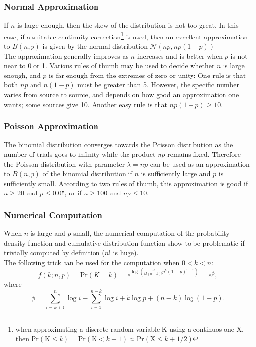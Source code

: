 \begin{appendices}
\subsubsection*{Normal Approximation}
If $n$ is large enough, then the skew of the distribution is not too great. In this case, if a suitable continuity correction\footnote{when approximating a discrete random variable $\textrm{K}$ using a continuos one $\textrm{X}$, then $\textrm{Pr}(\textrm{K}\leq k) = \textrm{Pr}(\textrm{K}< k+1) \approx \textrm{Pr}(\textrm{X}\leq k+1/2)$ } is used, then an excellent approximation to $B(n, p)$ is given by the normal distribution $\mathcal{N}(np,np(1-p))$\\
The approximation generally improves as $n$ increases and is better when $p$ is not near to 0 or 1. Various rules of thumb may be used to decide whether $n$ is large enough, and $p$ is far enough from the extremes of zero or unity:
One rule is that both $n p$ and $n(1-p)$ must be greater than 5. However, the specific number varies from source to source, and depends on how good an approximation one wants; some sources give 10. Another easy rule is that $np(1-p)\geq 10$.


\subsubsection*{Poisson Approximation}
The binomial distribution converges towards the Poisson distribution as the number of trials goes to infinity while the product $np$ remains fixed. Therefore the Poisson distribution with parameter $\lambda = np$ can be used as an approximation to $B(n, p)$ of the binomial distribution if $n$ is sufficiently large and $p$ is sufficiently small. According to two rules of thumb, this approximation is good if $n \geq 20$ and $p \leq 0.05$, or if $n \geq 100$ and $np \leq 10$.

\subsubsection*{Numerical Computation}
When $n$ is large and $p$ small, the numerical computation of the probability density function and cumulative distribution function show to be problematic if trivially computed by definition ($n!$ is huge).\\
The following trick can be used for the computation when $0<k<n$:
\begin{equation}
f(k;n,p)=\textrm{Pr}(K=k)= e^{\displaystyle \log(\frac{n!}{k!(n-k)!} p^{k} (1-p)^{n-k})}=e^{\phi},
\end{equation}
where
\begin{equation}
\phi=\sum_{i=k+1}^{n}\log i-\sum_{i=1}^{n-k}\log i+k\log p+(n-k) \log(1-p).
\end{equation}



\end{appendices}
